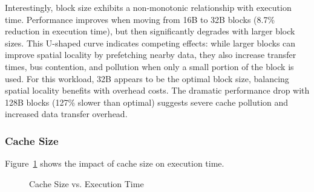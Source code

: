 \documentclass[a4paper,12pt]{article}
\begin{document}
Interestingly, block size exhibits a non-monotonic relationship with execution time. Performance improves when moving from 16B to 32B blocks (8.7\% reduction in execution time), but then significantly degrades with larger block sizes. This U-shaped curve indicates competing effects: while larger blocks can improve spatial locality by prefetching nearby data, they also increase transfer times, bus contention, and pollution when only a small portion of the block is used. For this workload, 32B appears to be the optimal block size, balancing spatial locality benefits with overhead costs. The dramatic performance drop with 128B blocks (127\% slower than optimal) suggests severe cache pollution and increased data transfer overhead.

\subsubsection{Cache Size}

Figure~\ref{fig:cachesize-perf} shows the impact of cache size on execution time.

\begin{figure}[htbp]
    \centering
    \caption{Cache Size vs. Execution Time}
    \label{fig:cachesize-perf}
\end{figure}
\end{document}
